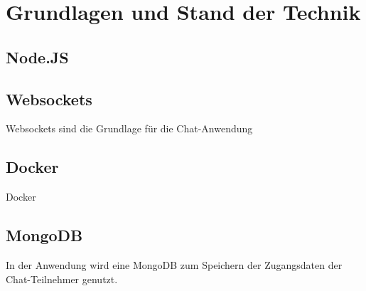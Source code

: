 
\chapter{Grundlagen und Stand der Technik}\label{cha:Grundlagen}
\section{Node.JS}\label{sec:Node.JS}

\section{Websockets}\label{sec:Websockets}
Websockets sind die Grundlage für die Chat-Anwendung
\section{Docker}\label{sec:Docker}
Docker 
\section{MongoDB}\label{sec:MongoDB}
In der Anwendung wird eine MongoDB zum Speichern der Zugangsdaten der Chat-Teilnehmer genutzt.